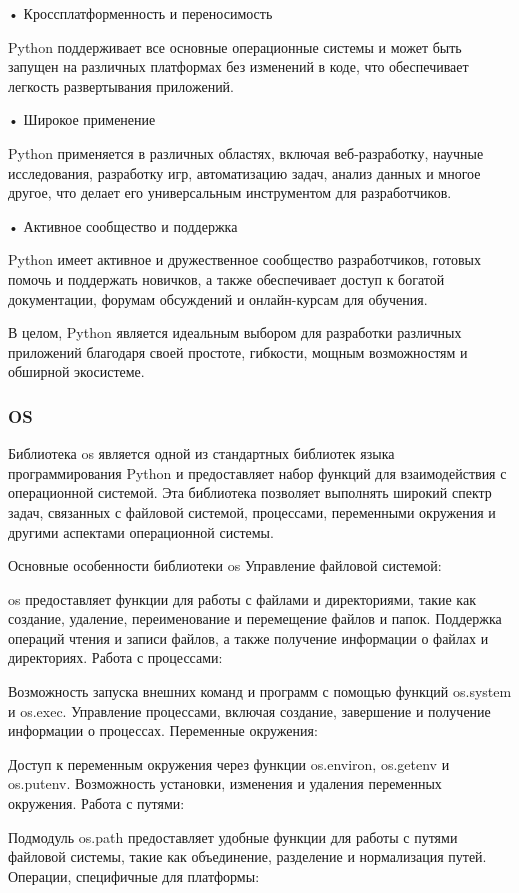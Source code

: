 • Кроссплатформенность и переносимость

Python поддерживает все основные операционные системы и может быть запущен на различных платформах без изменений в коде, что обеспечивает легкость развертывания приложений.

• Широкое применение

Python применяется в различных областях, включая веб-разработку, научные исследования, разработку игр, автоматизацию задач, анализ данных и многое другое, что делает его универсальным инструментом для разработчиков.

• Активное сообщество и поддержка 

Python имеет активное и дружественное сообщество разработчиков, готовых помочь и поддержать новичков, а также обеспечивает доступ к богатой документации, форумам обсуждений и онлайн-курсам для обучения.

В целом, Python является идеальным выбором для разработки различных приложений благодаря своей простоте, гибкости, мощным возможностям и обширной экосистеме.
\subsubsection{OS}
Библиотека os является одной из стандартных библиотек языка программирования Python и предоставляет набор функций для взаимодействия с операционной системой. Эта библиотека позволяет выполнять широкий спектр задач, связанных с файловой системой, процессами, переменными окружения и другими аспектами операционной системы.

Основные особенности библиотеки os
Управление файловой системой:

os предоставляет функции для работы с файлами и директориями, такие как создание, удаление, переименование и перемещение файлов и папок.
Поддержка операций чтения и записи файлов, а также получение информации о файлах и директориях.
Работа с процессами:

Возможность запуска внешних команд и программ с помощью функций os.system и os.exec.
Управление процессами, включая создание, завершение и получение информации о процессах.
Переменные окружения:

Доступ к переменным окружения через функции os.environ, os.getenv и os.putenv.
Возможность установки, изменения и удаления переменных окружения.
Работа с путями:

Подмодуль os.path предоставляет удобные функции для работы с путями файловой системы, такие как объединение, разделение и нормализация путей.
Операции, специфичные для платформы:

